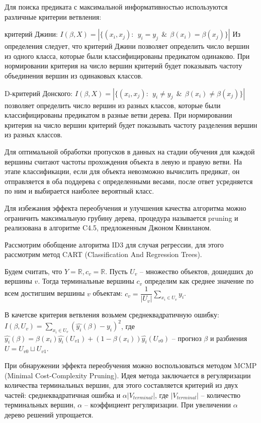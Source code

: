 Для поиска предиката с максимальной информативностью используются различные критерии ветвления:
\begin{description}[font=$\bullet$]
    \item критерий Джини: $I(\beta, X) = |\{ (x_i,x_j):~~ y_i = y_j ~~\&~~ \beta(x_i) = \beta(x_j) \}| $ Из определения следует, что критерий Джини позволяет определить число вершин из одного класса, которые были классифицированы предикатом одинаково. При нормировании критерия на число вершин критерий будет показывать частоту объединения вершин из одинаковых классов.
    \item D-критерий Донского: $I(\beta, X) = |\{ (x_i,x_j):~~ y_i \neq y_j ~~\&~~ \beta(x_i) \neq \beta(x_j) \}| $ позволяет определить число вершин из разных классов, которые были классифицированы предикатом в разные ветви дерева. При нормировании критерия на число вершин критерий будет показывать частоту разделения вершин из разных классов.
\end{description}

Для оптимальной обработки пропусков в данных на стадии обучения для каждой вершины считают частоты прохождения объекта в левую и правую ветви. На этапе классификации, если для объекта невозможно вычислить предикат, он отправляется в оба поддерева с определенными весами, после ответ усредняется по ним и выбирается наиболее вероятный класс.

Для избежания эффекта переобучения и улучшения качества алгоритма можно ограничить максимальную грубину дерева, процедура называется pruning и реализована в алгоритме C4.5, предложенным Джоном Квинланом.

Рассмотрим обобщение алгоритма ID3 для случая регрессии, для этого рассмотрим метод CART (Classification And Regression Trees).

Будем считать, что $Y = \mathbb{R}, c_v = \mathbb{R}$.
Пусть $U_v$ -- множество объектов, дошедших до вершины $v$. Тогда терминальные вершины $c_v$ определим как среднее значение по всем достигшим вершины $v$ объектам: $c_v = \dfrac{1}{|U_v|}\sum\limits_{x_i \in U_v} y_i$.

В качетсве критерия ветвления возьмем среднеквадратичную ошибку: $I(\beta, U_v) = \sum\limits_{x_i \in U_v} (\hat{y_i}(\beta) - y_i)^2$, где $\hat{y_i}(\beta) = \beta(x_i)\hat{y_i}(U_{v1}) + (1 - \beta(x_i))\hat{y_i}(U_{v0})$ -- прогноз $\beta$ и разбиения $U = U_{v0} \sqcup U_{v1}$.

При обнаружении эффекта переобучения можно воспользоваться методом MCMP (Minimal Cost-Complexity Pruning). Идея метода заключается в регуляризации количества терминальных вершин, для этого составляется критерий из двух частей: среднеквадратичная ошибка и $\alpha |V_{terminal}|$, где $|V_{terminal}|$ -- количество терминальных вершин, $\alpha$ -- коэффициент регуляризации. При увеличении $\alpha$ дерево решений упрощается.



